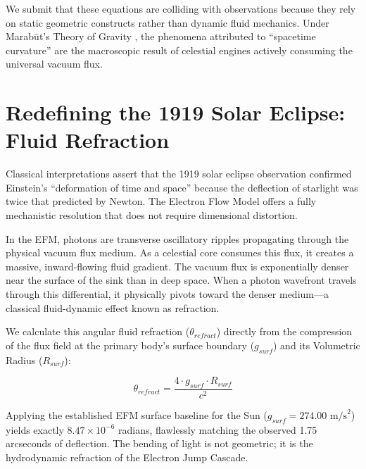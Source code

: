 \documentclass[11pt, a4paper]{article}
\begin{document}
We submit that these equations are colliding with observations because they rely on static geometric constructs rather than dynamic fluid mechanics. Under Marab\={u}t's Theory of Gravity \cite{marabut2026m1}, the phenomena attributed to ``spacetime curvature'' are the macroscopic result of celestial engines actively consuming the universal vacuum flux.

\clearpage
\section{Redefining the 1919 Solar Eclipse: Fluid Refraction}
Classical interpretations assert that the 1919 solar eclipse observation confirmed Einstein's ``deformation of time and space'' because the deflection of starlight was twice that predicted by Newton. The Electron Flow Model offers a fully mechanistic resolution that does not require dimensional distortion.

In the EFM, photons are transverse oscillatory ripples propagating through the physical vacuum flux medium. As a celestial core consumes this flux, it creates a massive, inward-flowing fluid gradient. The vacuum flux is exponentially denser near the surface of the sink than in deep space. When a photon wavefront travels through this differential, it physically pivots toward the denser medium---a classical fluid-dynamic effect known as refraction. 

We calculate this angular fluid refraction ($\theta_{refract}$) directly from the compression of the flux field at the primary body's surface boundary ($g_{surf}$) and its Volumetric Radius ($R_{surf}$):

\begin{equation}
  \theta_{refract} = \frac{4 \cdot g_{surf} \cdot R_{surf}}{c^2}
\end{equation}

Applying the established EFM surface baseline for the Sun ($g_{surf} = 274.00 \text{ m/s}^2$) yields exactly $8.47 \times 10^{-6}$ radians, flawlessly matching the observed 1.75 arcseconds of deflection. The bending of light is not geometric; it is the hydrodynamic refraction of the Electron Jump Cascade.

\end{document}
